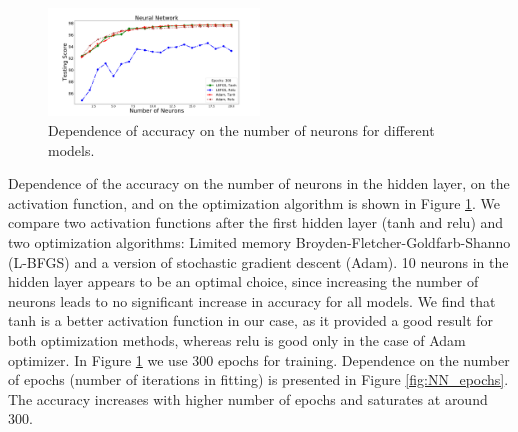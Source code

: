 \begin{figure}[h]
\hspace*{-0.5cm}
\includegraphics[width=0.5\textwidth]{plots/nn_neurons_300epochs.pdf}
\caption{Dependence of accuracy on the number of neurons for different models.}
\label{fig:NN_neurons}
\end{figure}

Dependence of the accuracy on the number of neurons in the hidden layer, on the activation function, 
and on the optimization algorithm is shown in Figure \ref{fig:NN_neurons}. 
We compare two activation functions after the first hidden layer (tanh and relu) and two optimization algorithms: Limited memory Broyden-Fletcher-Goldfarb-Shanno (L-BFGS) and a version of stochastic gradient descent (Adam). 
10 neurons in the hidden layer appears to be an optimal choice, since increasing the number of neurons leads to no significant increase in accuracy for all models. 
We find that tanh is a better activation function in our case, as it provided a good result for both optimization methods, whereas relu is good only in the case of Adam optimizer.
In Figure \ref{fig:NN_neurons} we use 300 epochs for training.
Dependence on the number of epochs (number of iterations in fitting) is presented in Figure \ref{fig:NN_epochs}. 
The accuracy increases with higher number of epochs and saturates at around 300. 




